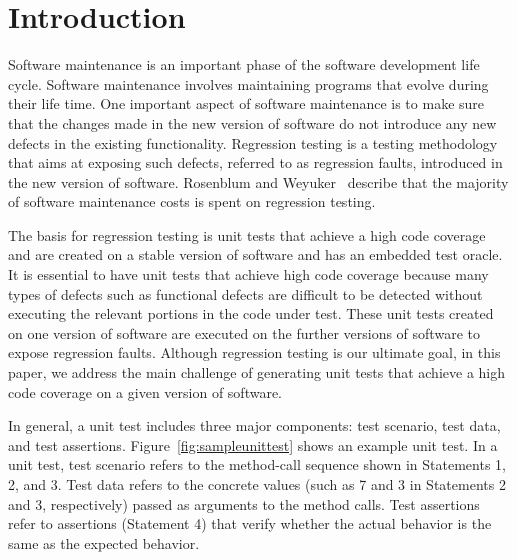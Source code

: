 \section{Introduction}
\label{sec:intro}

Software maintenance is an important phase of the software development life cycle. Software maintenance involves maintaining programs that evolve during their life time. One important aspect of software maintenance is to make sure that the changes made in the new version of software do not introduce any new defects in the existing functionality. Regression testing is a testing methodology that aims at exposing such defects, referred to as regression faults, introduced in the new version of software. Rosenblum and Weyuker~\cite{rosenblum96:regression} describe that the majority of software maintenance costs is spent on regression testing.

The basis for regression testing is unit tests that achieve a high code coverage and are created on a stable version of software and has an embedded test oracle. It is essential to have unit tests that achieve high code coverage because many types of defects such as functional defects are difficult to be detected without executing the relevant portions in the code under test. These unit tests created on one version of software are executed on the further versions of software to expose regression faults. Although regression testing is our ultimate goal, in this paper, we address the main challenge of generating unit tests that achieve a high code coverage on a given version of software.

In general, a unit test includes three major components: test scenario, test data, and test assertions. Figure~\ref{fig:sampleunittest} shows an example unit test. In a unit test, test scenario refers to the method-call sequence shown in Statements 1, 2, and 3. Test data refers to the concrete values (such as 7 and 3 in Statements 2 and 3, respectively) passed as arguments to the method calls. Test assertions refer to assertions (Statement 4) that verify whether the actual behavior is the same as the expected behavior.


